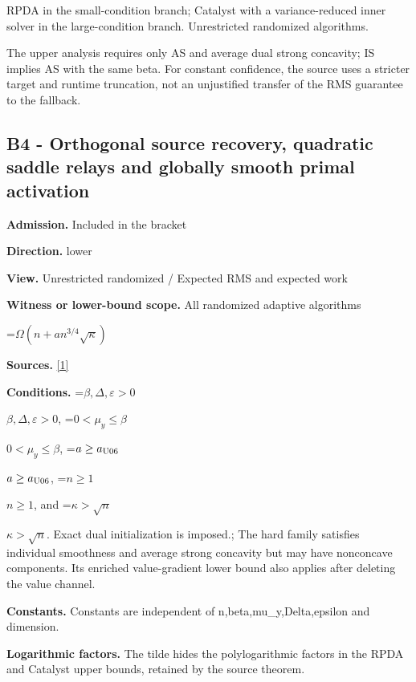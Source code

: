 \documentclass[10pt,a4paper]{article}
\newcommand{\AtlasMath}[1]{\par\begingroup\centering\setbox0=\hbox{$\displaystyle #1$}\ifdim\wd0>1.4\linewidth\typeout{ATLAS WIDE FORMULA: \the\wd0}\fi\ifdim\wd0>\linewidth\resizebox{\linewidth}{!}{\box0}\else\box0\fi\par\endgroup}
\newcommand{\AtlasInlineMath}[1]{\begingroup\setbox0=\hbox{$#1$}\ifdim\wd0>.4\linewidth\endgroup\AtlasMath{#1}\else\endgroup$#1$\fi}
\begin{document}
RPDA in the small-condition branch; Catalyst with a variance-reduced inner solver in the large-condition branch. Unrestricted randomized algorithms.



The upper analysis requires only AS and average dual strong concavity; IS implies AS with the same beta. For constant confidence, the source uses a stricter target and runtime truncation, not an unjustified transfer of the RMS guarantee to the fallback.



\subsection{B4 - Orthogonal source recovery, quadratic saddle relays and globally smooth primal activation}


\textbf{Admission.} Included in the bracket



\textbf{Direction.} lower



\textbf{View.} Unrestricted randomized / Expected RMS and expected work



\textbf{Witness or lower-bound scope.} All randomized adaptive algorithms



\AtlasMath{\Omega(n+a n^{3/4}\sqrt\kappa)}


\textbf{Sources.} \href{https://github.com/WU-Wendao/Colombo/blob/main/colombo_sensorium/Complexity_altas/data/sources/colombo/U06/manuscript.pdf}{[1]}



\textbf{Conditions.} \AtlasInlineMath{\beta,\Delta,\varepsilon>0}, \AtlasInlineMath{0<\mu_y\le\beta}, \AtlasInlineMath{a\ge a_{\rm U06}}, \AtlasInlineMath{n\ge1}, and \AtlasInlineMath{\kappa>\sqrt n}. Exact dual initialization is imposed.; The hard family satisfies individual smoothness and average strong concavity but may have nonconcave components. Its enriched value-gradient lower bound also applies after deleting the value channel.



\textbf{Constants.} Constants are independent of n,beta,mu\_y,Delta,epsilon and dimension.



\textbf{Logarithmic factors.} The tilde hides the polylogarithmic factors in the RPDA and Catalyst upper bounds, retained by the source theorem.
\end{document}
